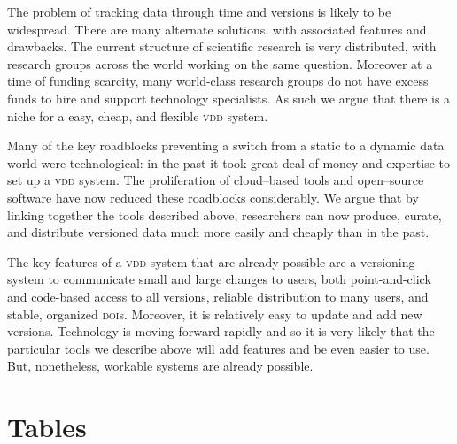 \documentclass[a4paper,11pt]{article}
\begin{document}
The problem of tracking data through time and versions is likely to be widespread. There are many alternate solutions, with associated features and drawbacks.
The current structure of scientific research is very distributed, with research groups across the world working on the same question.  Moreover at a time of funding scarcity, many world-class research groups do not have excess funds to hire and support technology specialists.  As such we argue that there is a niche for a easy, cheap, and flexible \textsc{vdd} system.

Many of the key roadblocks preventing a switch from a static to a dynamic data world were technological: in the past it took great deal of money and expertise to set up a \textsc{vdd} system. The proliferation of cloud--based tools and open--source software have now reduced these roadblocks considerably.  We argue that by linking together the tools described above, researchers can now produce, curate, and distribute versioned data much more easily and cheaply than in the past.

The key features of a \textsc{vdd} system that are already possible are a versioning system to communicate small and large changes to users, both point-and-click and code-based access to all versions, reliable distribution to many users, and stable, organized \textsc{doi}s.  Moreover, it is relatively easy to update and add new versions.  Technology is moving forward rapidly and so it is very likely that the particular tools we describe above will add features and be even easier to use.  But, nonetheless, workable systems are already possible.


\newpage

\section{Tables}
\end{document}
